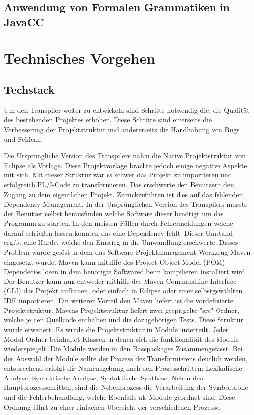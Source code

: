	\subsection{Anwendung von Formalen Grammatiken in JavaCC}


\section{Technisches Vorgehen}
\subsection{Techstack}
Um den Transpiler weiter zu entwickeln sind Schritte notwendig die, die Qualität des bestehenden Projektes erhöhen. Diese Schritte sind einerseits die Verbesserung der Projektstruktur und andererseits die Handhabung von Bugs und Fehlern.

Die Ursprüngliche Version des Transpilers nahm die Native Projektstruktur von Eclipse als Vorlage. Diese Projektvorlage brachte jedoch einige negative Aspekte mit sich. Mit dieser Struktur war es schwer das Projekt zu importieren und erfolgreich PL/I-Code zu transformieren. Das erschwerte den Benutzern den Zugang zu dem eigentlichen Projekt.
Zurückzuführen ist dies auf das fehlenden Dependency Management. In der Ursprünglichen Version des Transpilers musste der Benutzer selbst herausfinden welche Software dieser benötigt um das Programm zu starten. In den meisten Fällen durch Fehlermeldungen welche darauf schließen lassen konnten das eine Dependency fehlt. Dieser Umstand ergibt eine Hürde, welche den Einstieg in die Umwandlung erschwerte. 
Dieses Problem wurde gelöst in dem das Software Projektmanagement Werkzeug Maven eingesetzt wurde. Maven kann mithilfe des Project-Object-Model (POM) Dependecies lösen in dem benötigte Softwared beim kompilieren installiert wird. Der Benutzer kann nun entweder mithilfe des Maven Commandline-Interface (CLI) das Projekt aufbauen, oder einfach in Eclipse oder einer selbstgewählten IDE importieren.
Ein weiterer Vorteil den Maven liefert ist die vordefinierte Projektstruktur. Mavens Projektstruktur liefert zwei gespiegelte "src" Ordner, welche je den Quellcode enthalten und die dazugehörigen Tests. Diese Struktur wurde erweitert. Es wurde die Projektstruktur in Module unterteilt. Jeder Modul-Ordner beinhaltet Klassen in denen sich die funktionalität des Moduls wiederspiegelt. Die Module werden in den Basepackages Zusammengefasst. Bei der Auswahl der Module sollte der Prozess des Transformierens deutlich werden, entsprechend erfolgt die Namensgebung nach den Prozesschritten: Lexikalische Analyse, Syntaktische Analyse, Syntaktische Synthese. Neben den Hauptprozessschritten, sind die Nebenprozess die Verarbeitung der Symboltablle und die Fehlerbehandlung, welche Ebenfalls als Module geordnet sind. Diese Ordnung führt zu einer einfachen Übersicht der verschiedenen Prozesse.

